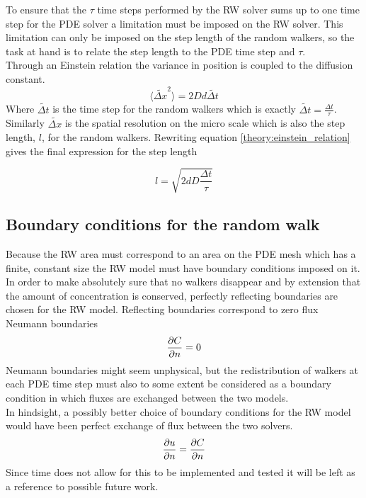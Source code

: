 To ensure that the $\tau$ time steps performed by the RW solver sums up to one time step for the PDE solver a limitation must be imposed on the RW solver. 
This limitation can only be imposed on the step length of the random walkers, so the task at hand is to relate the step length to the PDE time step and $\tau$. \\
Through an Einstein relation the variance in position is coupled to the diffusion constant.
\begin{equation}\label{theory:einstein_relation}
 \langle\tilde{\Delta x}^2\rangle = 2Dd\tilde{\Delta t}
\end{equation}
Where $\tilde{\Delta t}$ is the time step for the random walkers which is exactly $\tilde{\Delta t} = \frac{\Delta t}{\tau}$. 
Similarly $\tilde{\Delta x}$ is the spatial resolution on the micro scale which is also the step length, $l$, for the random walkers. 
Rewriting equation \eqref{theory:einstein_relation} gives the final expression for the step length

\begin{equation}\label{theory:step_length}
 l = \sqrt{2dD\frac{\Delta t}{\tau}}
\end{equation}

\subsection{Boundary conditions for the random walk}\label{theory:BC_RW}

Because the RW area must correspond to an area on the PDE mesh which has a finite, constant size the RW model must have boundary conditions imposed on it. 
In order to make absolutely sure that no walkers disappear and by extension that the amount of concentration is conserved, perfectly reflecting boundaries are chosen for the RW model. 
Reflecting boundaries correspond to zero flux Neumann boundaries
\begin{equation}
 \frac{\partial C}{\partial n} = 0
\end{equation}
Neumann boundaries might seem unphysical, but the redistribution of walkers at each PDE time step must also to some extent be considered as a boundary condition in which fluxes are exchanged between the two models. \\
In hindsight, a possibly better choice of boundary conditions for the RW model would have been perfect exchange of flux between the two solvers. 
\begin{equation}
 \frac{\partial u}{\partial n} = \frac{\partial C}{\partial n}
\end{equation}
Since time does not allow for this to be implemented and tested it will be left as a reference to possible future work.

